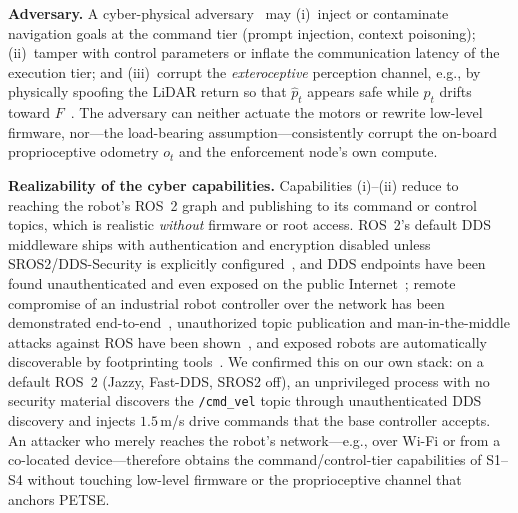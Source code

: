 \documentclass[journal,twoside,web]{ieeecolor}
\begin{document}
\textbf{Adversary.} A cyber-physical adversary~\cite{yaacoub2022robotics}
may (i)~inject or contaminate navigation goals at the command tier
(prompt injection, context poisoning); (ii)~tamper with control
parameters or inflate the communication latency of the execution tier;
and (iii)~corrupt the \emph{exteroceptive} perception channel, e.g., by
physically spoofing the LiDAR return so that $\hat{p}_t$ appears safe
while $p_t$ drifts toward $F$~\cite{cao2019adversarial,sun2020towards}.
The adversary can neither actuate the motors or rewrite low-level
firmware, nor---the load-bearing assumption---consistently corrupt the
on-board proprioceptive odometry $o_t$ and the enforcement node's own
compute.

\textbf{Realizability of the cyber capabilities.} Capabilities (i)--(ii)
reduce to reaching the robot's ROS~2 graph and publishing to its command
or control topics, which is realistic \emph{without} firmware or root
access. ROS~2's default DDS middleware ships with authentication and
encryption disabled unless SROS2/DDS-Security is explicitly
configured~\cite{mayoralvilches2022sros2,diluoffo2018ros2}, and DDS
endpoints have been found unauthenticated and even exposed on the public
Internet~\cite{maggi2022dds}; remote compromise of an industrial robot
controller over the network has been demonstrated
end-to-end~\cite{quarta2017experimental}, unauthorized topic publication
and man-in-the-middle attacks against ROS have been
shown~\cite{dieber2017security}, and exposed robots are automatically
discoverable by footprinting tools~\cite{mayoralvilches2018aztarna}. We
confirmed this on our own stack: on a default ROS~2 (Jazzy, Fast-DDS,
SROS2 off), an unprivileged process with no security material discovers
the \texttt{/cmd\_vel} topic through unauthenticated DDS discovery and
injects $1.5$\,m/s drive commands that the base controller accepts.
An attacker who merely reaches the robot's network---e.g., over Wi-Fi or
from a co-located device---therefore obtains the command/control-tier
capabilities of S1--S4 without touching low-level firmware or the
proprioceptive channel that anchors PETSE.
\end{document}
